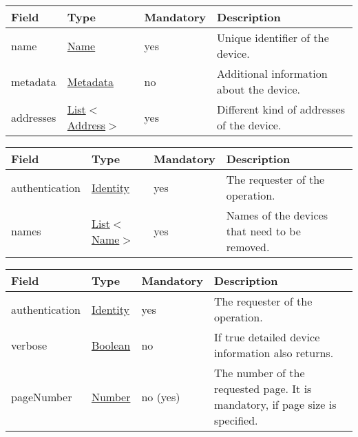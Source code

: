 \documentclass[a4paper]{arrowhead}
\newcommand{\pref}[1]{{\textcolor{ArrowheadGrey}{\hyperref[sec:model:primitives:#1]{#1}}}}
\begin{document}
 
\begin{table}[ht!]
\begin{tabularx}{\textwidth}{| p{2.5cm} | p{2.5cm} | p{2cm} | X |} \hline
\rowcolor{gray!33} Field & Type & Mandatory & Description \\ \hline
name & \pref{Name} & yes & Unique identifier of the device. \\ \hline
metadata &\hyperref[sec:model:Metadata]{Metadata} & no & Additional information about the device. \\ \hline
addresses &  \pref{List}$<$\pref{Address}$>$ & yes & Different kind of addresses of the device.  \\ \hline
\end{tabularx}
\end{table}


\begin{table}[ht!]
\begin{tabularx}{\textwidth}{| p{2.5cm} | p{2.5cm} | p{2cm} | X |} \hline
\rowcolor{gray!33} Field & Type & Mandatory & Description \\ \hline
authentication & \hyperref[sec:model:Identity]{Identity} & yes & The requester of the operation. \\ \hline
names &  \pref{List}$<$\pref{Name}$>$ & yes & Names of the devices that need to be removed. \\ \hline
\end{tabularx}
\end{table}


\begin{table}[ht!]
\begin{tabularx}{\textwidth}{| p{4.3cm} | p{4.8cm} | p{2cm} | X |} \hline
\rowcolor{gray!33} Field & Type & Mandatory & Description \\ \hline
authentication & \hyperref[sec:model:Identity]{Identity} & yes & The requester of the operation. \\ \hline
verbose & \pref{Boolean} & no & If true detailed device information also returns. \\ \hline
pageNumber & \pref{Number} & no (yes) & The number of the requested page. It is mandatory, if page size is specified. \\ \hline
\end{tabularx}
\end{table}
\end{document}
